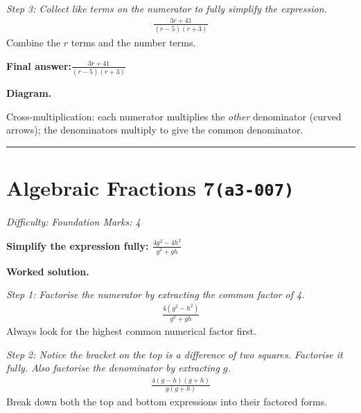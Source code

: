 \documentclass[11pt]{article}
\newcommand{\question}[1]{\par\medskip\noindent\textbf{#1}\par}
\begin{document}
\textit{Step 3: Collect like terms on the numerator to fully simplify the expression.}
\[\begin{gathered}
\frac{3r + 41}{(r-5)(r+3)}
\end{gathered}\]
Combine the \( r \) terms and the number terms.

\begin{answerbox}
\textbf{Final answer:}\quad \(\displaystyle \frac{3r + 41}{(r-5)(r+3)}\)
\end{answerbox}
\textbf{Diagram.}

\begin{center}
\end{center}
\small Cross-multiplication: each numerator multiplies the \emph{other} denominator (curved arrows); the denominators multiply to give the common denominator.\normalsize

\medskip\hrule

\section*{Algebraic Fractions 7\quad\small\texttt{(a3-007)}}
\textit{Difficulty: Foundation \quad\textbar\quad Marks: 4}

\question{Simplify the expression fully: \( \frac{4g^2 - 4h^2}{g^2 + gh} \)}

\textbf{Worked solution.}

\textit{Step 1: Factorise the numerator by extracting the common factor of 4.}
\[\begin{gathered}
\frac{4(g^2 - h^2)}{g^2 + gh}
\end{gathered}\]
Always look for the highest common numerical factor first.

\textit{Step 2: Notice the bracket on the top is a difference of two squares. Factorise it fully. Also factorise the denominator by extracting \( g \).}
\[\begin{gathered}
\frac{4(g-h)(g+h)}{g(g+h)}
\end{gathered}\]
Break down both the top and bottom expressions into their factored forms.
\end{document}
